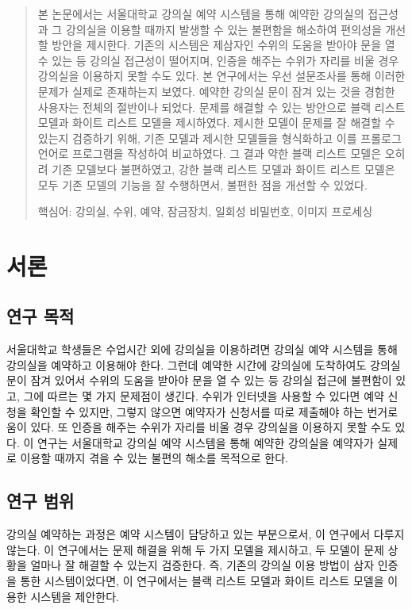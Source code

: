 \documentclass[11pt,a4paper]{article}
\begin{document}
\thispagestyle{empty}
\pagebreak
{}
\setcounter{page}{1}
\renewcommand{\abstractname}{초록}
\begin{abstract}
본 논문에서는 서울대학교 강의실 예약 시스템을 통해 예약한 강의실의 접근성과 그 강의실을 이용할 때까지 발생할 수 있는 불편함을 해소하여 편의성을 개선할 방안을 제시한다. 기존의 시스템은 제삼자인 수위의 도움을 받아야 문을 열 수 있는 등 강의실 접근성이 떨어지며, 인증을 해주는 수위가 자리를 비울 경우 강의실을 이용하지 못할 수도 있다. 본 연구에서는 우선 설문조사를 통해 이러한 문제가 실제로 존재하는지 보였다. 예약한 강의실 문이 잠겨 있는 것을 경험한 사용자는 전체의 절반이나 되었다. 문제를 해결할 수 있는 방안으로 블랙 리스트 모델과 화이트 리스트 모델을 제시하였다. 제시한 모델이 문제를 잘 해결할 수 있는지 검증하기 위해, 기존 모델과 제시한 모델들을 형식화하고 이를 프롤로그 언어로 프로그램을 작성하여 비교하였다. 그 결과 약한 블랙 리스트 모델은 오히려 기존 모델보다 불편하였고, 강한 블랙 리스트 모델과 화이트 리스트 모델은 모두 기존 모델의 기능을 잘 수행하면서, 불편한 점을 개선할 수 있었다.\\
\centerline{핵심어: 강의실, 수위, 예약, 잠금장치, 일회성 비밀번호, 이미지 프로세싱}
\end{abstract}
\pagebreak

\renewcommand{\contentsname}{목차}
\tableofcontents

\pagebreak
{}
\setcounter{page}{1}
\section{서론}

\subsection{연구 목적}
서울대학교 학생들은 수업시간 외에 강의실을 이용하려면 강의실 예약 시스템을 통해 강의실을 예약하고 이용해야 한다. 그런데 예약한 시간에 강의실에 도착하여도 강의실 문이 잠겨 있어서 수위의 도움을 받아야 문을 열 수 있는 등 강의실 접근에 불편함이 있고, 그에 따르는 몇 가지 문제점이 생긴다. 수위가 인터넷을 사용할 수 있다면 예약 신청을 확인할 수 있지만, 그렇지 않으면 예약자가 신청서를 따로 제출해야 하는 번거로움이 있다. 또 인증을 해주는 수위가 자리를 비울 경우 강의실을 이용하지 못할 수도 있다. 이 연구는 서울대학교 강의실 예약 시스템을 통해 예약한 강의실을 예약자가 실제로 이용할 때까지 겪을 수 있는 불편의 해소를 목적으로 한다.

\subsection{연구 범위}
강의실 예약하는 과정은 예약 시스템이 담당하고 있는 부분으로서, 이 연구에서 다루지 않는다. 이 연구에서는 문제 해결을 위해 두 가지 모델을 제시하고, 두 모델이 문제 상황을 얼마나 잘 해결할 수 있는지 검증한다. 즉, 기존의 강의실 이용 방법이 삼자 인증을 통한 시스템이었다면, 이 연구에서는 블랙 리스트 모델과 화이트 리스트 모델을 이용한 시스템을 제안한다.
\end{document}
